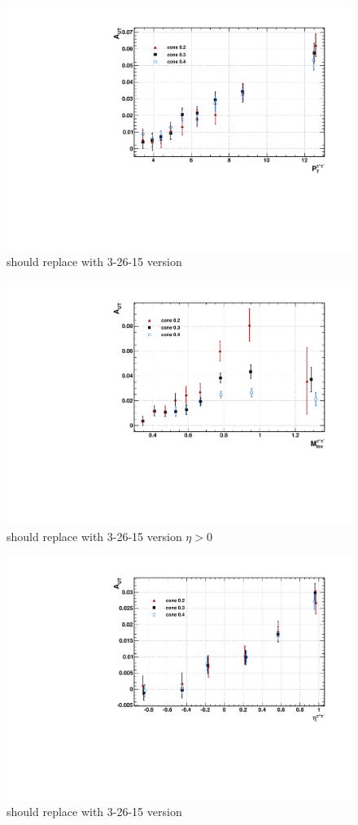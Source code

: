 \documentclass[abstract = on,listof=totoc, bibliography=totoc]{scrreprt}
\newcommand{\ptpair}{P_{T}^{\pi^+\pi^-}}
\newcommand{\mpair}{M_{inv}^{\pi^+\pi^-}}
\newcommand{\etapair}{\eta^{\pi^+\pi^-}}
\begin{document}
\begin{figure}
\begin{center}
\includegraphics[width = .7\textwidth]{allConesPt}
\caption[Asymmetry vs $\ptpair$ for different cone radii]{should replace with 3-26-15 version}
\label{fig:allConesPt $\eta > 0$}
\end{center}
\end{figure}

\begin{figure}
\begin{center}
\includegraphics[width = .7\textwidth]{allConesMass}
\caption[Asymmetry vs $\mpair$ for different cone radii]{should replace with 3-26-15 version $\eta > 0$}
\label{fig:allConesMass}
\end{center}
\end{figure}

\begin{figure}
\begin{center}
\includegraphics[width = .7\textwidth]{allConesEta}
\caption[Asymmetry vs $\etapair$ for different cone radii]{should replace with 3-26-15 version}
\label{fig:allConesEta}
\end{center}
\end{figure}
\end{document}
